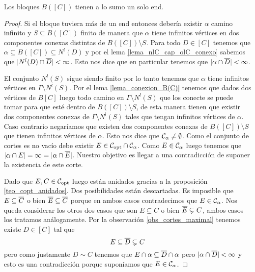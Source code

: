 \documentclass[tesis.tex]{subfiles}
\begin{document}
\begin{lema}\label{lema_bloques_1_end}
	Los bloques $B([C])$ tienen a lo sumo un solo end.
\end{lema}
\begin{proof}
	Si el bloque tuviera más de un end entonces debería existir $\alpha$ camino infinito y $S \subseteq B([C])$ finito de manera que $\alpha$ tiene infinitos vértices en dos componentes conexas distintas de $B([C]) \setminus S$.
	Para todo $D \in [C]$ tenemos que $\alpha \subseteq B([C]) \subseteq N^l(D)$ y por el lema \ref{lema_nlC_cap_olC_conexo} sabemos que $|N^l(D) \cap \overline D | < \infty$.
	Esto nos dice que en particular tenemos que $|\alpha \cap \overline D| < \infty$.
	
	El conjunto $N^l(S)$ sigue siendo finito por lo tanto tenemos que $\alpha$ tiene infinitos vértices en $\Gamma \setminus N^l(S)$.
	Por el lema \ref{lema_conexion_B(C)} tenemos que dados dos vértices de $B[C]$ luego todo camino en $\Gamma \setminus N^l(S)$ que los conecte se puede tomar para que esté dentro de $B([C]) \setminus S$, de esta manera tienen que existir dos componentes conexas de $\Gamma \setminus N^l(S)$ tales que tengan infinitos vértices de $\alpha$. 
	Caso contrario negaríamos que existen dos componentes conexas de $B([C]) \setminus S$ que tienen infinitos vértices de $\alpha$.
	Esto nos dice que ${\cal C}_{\alpha} \neq \emptyset$.
	Como el conjunto de cortes es no vacío debe existir $E \in {\cal C}_{\text{opt}} \cap {\cal C}_{\alpha}$.
	Como $E \in {\cal C}_{\alpha}$ luego tenemos que $|\alpha \cap E| = \infty = |\alpha \cap \overline E|$.
	Nuestro objetivo es llegar a una contradicción de suponer la existencia de este corte. 	
	
	Dado que $E,C \in {\cal C}_{\text{opt}}$ luego están anidados gracias a la proposición \ref{teo_copt_anidados}.
	Dos posibilidades están descartadas. 
	Es imposible que $E \subseteq \overline C$ o bien $\overline E \subseteq \overline C$ porque en ambos casos contradecimos que $E \in {\cal C}_{\alpha}$.
	Nos queda considerar los otros dos casos que son $E \subsetneq C$ o bien $\overline E \subsetneq C$, ambos casos los tratamos análogamente.
	Por la observación \ref{obs_cortes_maximal} tenemos existe $D \in [C]$ tal que 
	\[
		E \subseteq \overline D \subsetneq C
	\]
	pero como justamente $D \sim C$ tenemos que $E \cap \alpha \subseteq \overline D \cap \alpha$ pero $|\alpha \cap \overline D| < \infty$ y esto es una contradicción porque suponíamos que $E \in {\cal C}_{\alpha}$.
\end{proof}
\end{document}
